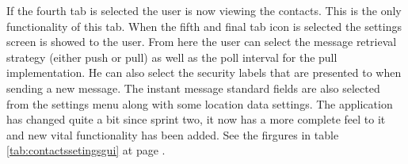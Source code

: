 \newpage

If the fourth tab is selected the user is now viewing the contacts. This is the only functionality of this tab. 
\newline
\newline
When the fifth and final tab icon is selected the settings screen is showed to the user. From here the user can select the message retrieval strategy (either push or pull) as well as the poll interval for the pull implementation. He can also select the security labels that are presented to when sending a new message. The instant message standard fields are also selected from the settings menu along with some location data settings.   
\newline
\newline
The application has changed quite a bit since sprint two, it now has a more complete feel to it and new vital functionality has been added. See the firgures in table \ref{tab:contactssetingsgui} at page \pageref{tab:contactssetingsgui}.